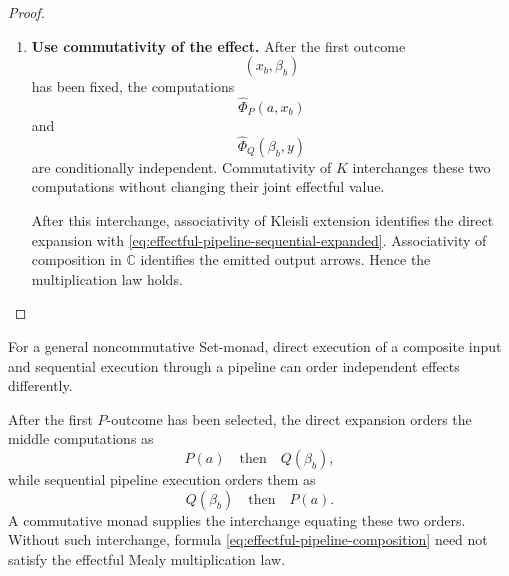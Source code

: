 \begin{proof}
\begin{enumerate}
        Before using commutativity, the direct expansion orders its middle
        computations as
        \[
            \widehat\Phi_P(a,x_b)
            \quad\text{then}\quad
            \widehat\Phi_Q(\beta_b,y),
        \]
        whereas sequential pipeline execution orders them as
        \[
            \widehat\Phi_Q(\beta_b,y)
            \quad\text{then}\quad
            \widehat\Phi_P(a,x_b).
        \]

        \item \textbf{Use commutativity of the effect.}
        After the first outcome
        \[
            (x_b,\beta_b)
        \]
        has been fixed, the computations
        \[
            \widehat\Phi_P(a,x_b)
        \]
        and
        \[
            \widehat\Phi_Q(\beta_b,y)
        \]
        are conditionally independent. Commutativity of \(K\) interchanges
        these two computations without changing their joint effectful value.

        After this interchange, associativity of Kleisli extension identifies
        the direct expansion with
        \eqref{eq:effectful-pipeline-sequential-expanded}. Associativity of
        composition in \(\mathbb C\) identifies the emitted output arrows.
        Hence the multiplication law holds.
    \end{enumerate}
\end{proof}

\begin{remark}
\label{rem:effectful-pipeline-commutativity-required}
    For a general noncommutative Set-monad, direct execution of a composite
    input and sequential execution through a pipeline can order independent
    effects differently.

    After the first \(P\)-outcome has been selected, the direct expansion
    orders the middle computations as
    \[
        P(a)
        \quad\text{then}\quad
        Q(\beta_b),
    \]
    while sequential pipeline execution orders them as
    \[
        Q(\beta_b)
        \quad\text{then}\quad
        P(a).
    \]
    A commutative monad supplies the interchange equating these two orders.
    Without such interchange, formula
    \eqref{eq:effectful-pipeline-composition} need not satisfy the effectful
    Mealy multiplication law.
\end{remark}

